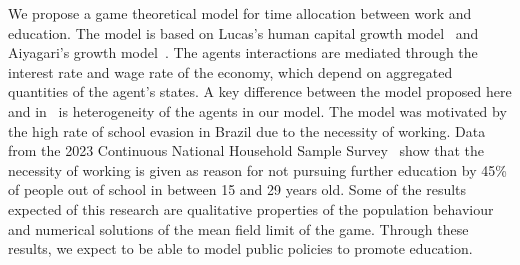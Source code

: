 We propose a game theoretical model for time allocation between work and education.
The model is based on Lucas's human capital growth model~\cite{lucas1988mechanics} and 
Aiyagari’s growth model~\cite{achdou2022income,carmona2018probabilistic}.
The agents interactions are mediated through the interest rate and wage rate of the economy,
which depend on aggregated quantities of the agent's states.
A key difference between the model proposed here and in~\cite{lucas1988mechanics} is heterogeneity of the agents in our model.
The model was motivated by the high rate of school evasion in Brazil due to the necessity of working.
Data from the 2023 Continuous National Household Sample Survey~\cite{pnad2023} show that the necessity of working
is given as reason for not pursuing further education by 45\% of people out of school in between 15 and 29 years old. 
Some of the results expected of this research are qualitative properties
of the population behaviour and numerical solutions of the mean field limit
of the game. Through these results, we expect to be able to model public policies
to promote education.



